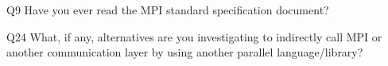 \begin{description}%
\item{Q9} Have you ever read the MPI standard specification document?%
\item{Q24} What, if any, alternatives are you investigating to indirectly call MPI or another communication layer by using another parallel language/library?%
\end{description}%
